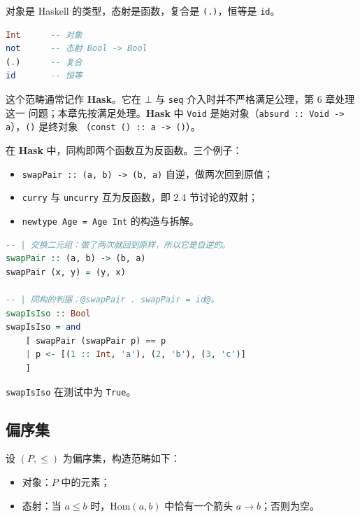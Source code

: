 对象是 Haskell 的类型，态射是函数，复合是 \passthrough{\lstinline!(.)!}，恒等是 \passthrough{\lstinline!id!}。

\begin{lstlisting}[language=Haskell]
Int      -- 对象
not      -- 态射 Bool -> Bool
(.)      -- 复合
id       -- 恒等
\end{lstlisting}

这个范畴通常记作 \textbf{Hask}。它在 \(\bot\) 与 \passthrough{\lstinline!seq!} 介入时并不严格满足公理，第 6 章处理这一
问题；本章先按满足处理。\textbf{Hask} 中 \passthrough{\lstinline!Void!} 是始对象（\passthrough{\lstinline!absurd :: Void -> a!}），\passthrough{\lstinline!()!} 是终对象
（\passthrough{\lstinline!const () :: a -> ()!}）。

在 \textbf{Hask} 中，同构即两个函数互为反函数。三个例子：

\begin{itemize}
\tightlist
\item
  \passthrough{\lstinline!swapPair :: (a, b) -> (b, a)!} 自逆，做两次回到原值；
\item
  \passthrough{\lstinline!curry!} 与 \passthrough{\lstinline!uncurry!} 互为反函数，即 2.4 节讨论的双射；
\item
  \passthrough{\lstinline!newtype Age = Age Int!} 的构造与拆解。
\end{itemize}

\begin{lstlisting}[language=Haskell]
-- | 交换二元组：做了两次就回到原样，所以它是自逆的。
swapPair :: (a, b) -> (b, a)
swapPair (x, y) = (y, x)

-- | 同构的判据：@swapPair . swapPair = id@。
swapIsIso :: Bool
swapIsIso = and
    [ swapPair (swapPair p) == p
    | p <- [(1 :: Int, 'a'), (2, 'b'), (3, 'c')]
    ]
\end{lstlisting}

\passthrough{\lstinline!swapIsIso!} 在测试中为 \passthrough{\lstinline!True!}。

\subsection{偏序集}\label{ux504fux5e8fux96c6}

设 \((P, \leq)\) 为偏序集，构造范畴如下：

\begin{itemize}
\tightlist
\item
  对象：\(P\) 中的元素；
\item
  态射：当 \(a \leq b\) 时，\(\mathrm{Hom}(a, b)\) 中恰有一个箭头 \(a \to b\)；否则为空。
\end{itemize}

